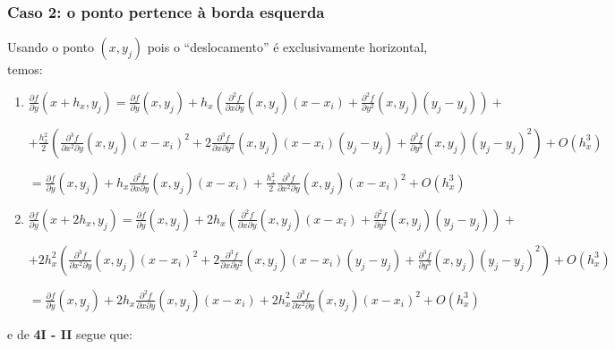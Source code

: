 \documentclass[11pt]{article}
\begin{document}
  \subsubsection{Caso 2: o ponto pertence à borda esquerda}

  \indent\indent Usando o ponto $(x, y_j)$ pois o ``deslocamento'' é exclusivamente horizontal, temos:

  \begin{enumerate}[label=\textbf{\Roman*)}]
    \item $\frac{\partial f}{\partial y}(x + h_x, y_j) = \frac{\partial f}{\partial y}(x, y_j) + h_x\left(\frac{\partial^2 f}{\partial x \partial y}\left(x, y_j \right)\left(x - x_i \right) + \frac{\partial^2 f}{\partial y^2}\left(x, y_j \right)\left(y_j - y_j \right) \right) +$

    $+ \frac{h_x^2}{2}\left(\frac{\partial^3 f}{\partial x^2 \partial y}\left(x, y_j\right)\left(x - x_i\right)^2 + 2\frac{\partial^3 f}{\partial x \partial y^2}\left(x, y_j \right)\left(x - x_i\right)\left(y_j - y_j\right) +
    \frac{\partial^3 f}{\partial y^3}\left(x, y_j\right)\left(y_j - y_j\right)^2 \right) + O(h_x^3)$

    $= \frac{\partial f}{\partial y}(x, y_j) + h_x\frac{\partial^2 f}{\partial x \partial y}\left(x, y_j \right)\left(x - x_i \right) + \frac{h_x^2}{2}\frac{\partial^3 f}{\partial x^2 \partial y}\left(x, y_j\right)\left(x - x_i\right)^2 + O(h_x^3)$

    \item $\frac{\partial f}{\partial y}(x + 2h_x, y_j) = \frac{\partial f}{\partial y}(x, y_j) + 2h_x\left(\frac{\partial^2 f}{\partial x \partial y}\left(x, y_j \right)\left(x - x_i \right) + \frac{\partial^2 f}{\partial y^2}\left(x, y_j \right)\left(y_j - y_j \right) \right) +$

    $+ 2h_x^2\left(\frac{\partial^3 f}{\partial x^2 \partial y}\left(x, y_j\right)\left(x - x_i\right)^2 + 2\frac{\partial^3 f}{\partial x \partial y^2}\left(x, y_j \right)\left(x - x_i\right)\left(y_j - y_j\right) +
    \frac{\partial^3 f}{\partial y^3}\left(x, y_j\right)\left(y_j - y_j\right)^2 \right) + O(h_x^3)$

    $= \frac{\partial f}{\partial y}(x, y_j) + 2h_x\frac{\partial^2 f}{\partial x \partial y}\left(x, y_j \right)\left(x - x_i \right) + 2h_x^2\frac{\partial^3 f}{\partial x^2 \partial y}\left(x, y_j\right)\left(x - x_i\right)^2 + O(h_x^3)$
  \end{enumerate}

  e de \textbf{4I - II} segue que:
\end{document}
